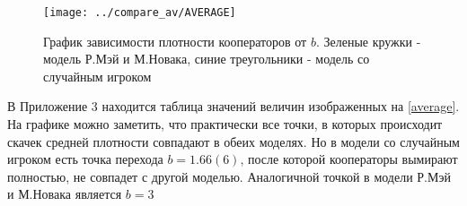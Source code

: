 \documentclass[12pt,a4paper]{article}
\begin{document}
	\begin{figure}
			\centering
			\texttt{[image: ../compare\_av/AVERAGE]}
			\caption{График зависимости плотности кооператоров от $b$. Зеленые кружки - модель Р.Мэй и М.Новака, синие треугольники - модель со случайным игроком}
			\label{fig:average}
	\end{figure}
	
	В Приложение 3 находится таблица значений величин изображенных на \ref{average}. На графике можно заметить, что практически все точки, в которых происходит скачек средней плотности совпадают в обеих моделях. Но в модели со случайным игроком есть точка перехода $b=1.66(6)$, после которой кооператоры вымирают полностью, не совпадет с другой моделью. Аналогичной точкой в модели Р.Мэй и М.Новака является $b=3$
	
\end{document}
